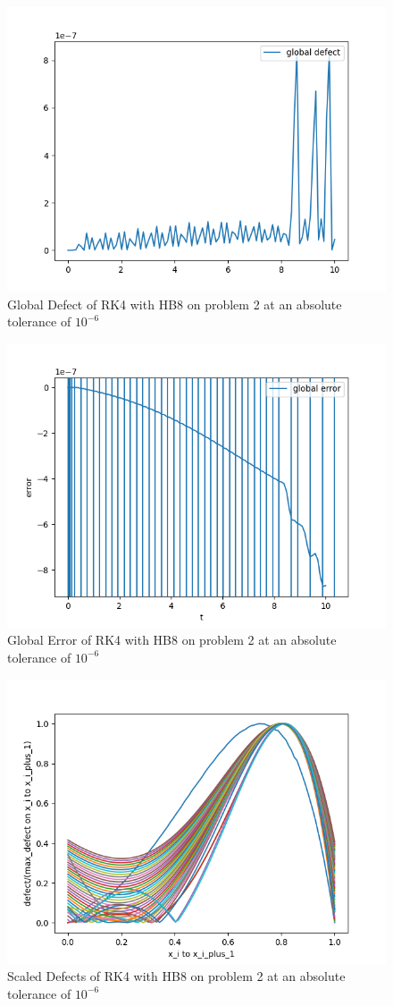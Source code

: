 \documentclass{article}
\begin{document}
\begin{figure}[H]
\centering
\includegraphics[width=0.7\linewidth]{./figures/rk4_with_hb8_p2_global_defect}
\caption{Global Defect of RK4 with HB8 on problem 2 at an absolute tolerance of $10^{-6}$}
\label{fig:rk4_with_hb8_p2_global_defect}
\end{figure}

\begin{figure}[H]
\centering
\includegraphics[width=0.7\linewidth]{./figures/rk4_with_hb8_p2_global_error}
\caption{Global Error of RK4 with HB8 on problem 2 at an absolute tolerance of $10^{-6}$}
\label{fig:rk4_with_hb8_p2_global_error}
\end{figure}

\begin{figure}[H]
\centering
\includegraphics[width=0.7\linewidth]{./figures/rk4_with_hb8_p2_scaled_defects}
\caption{Scaled Defects of RK4 with HB8 on problem 2 at an absolute tolerance of $10^{-6}$}
\label{fig:rk4_with_hb8_p2_scaled_defects}
\end{figure}
\end{document}
